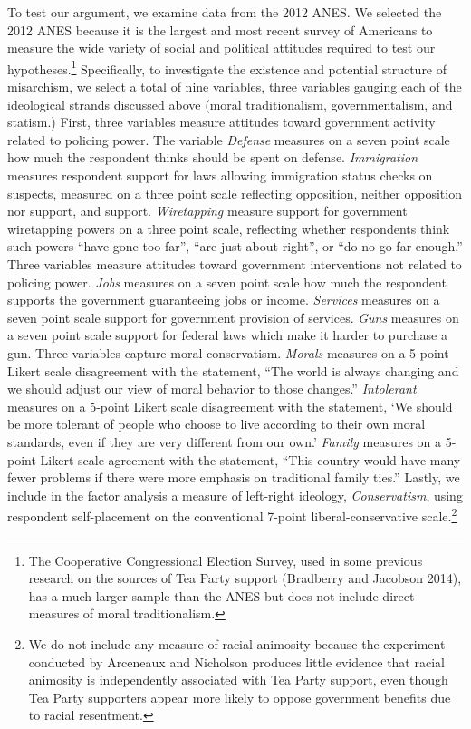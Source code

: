 \documentclass[12pt,]{article}
\begin{document}
To test our argument, we examine data from the 2012 ANES. We selected
the 2012 ANES because it is the largest and most recent survey of
Americans to measure the wide variety of social and political attitudes
required to test our hypotheses.\footnote{The Cooperative Congressional
  Election Survey, used in some previous research on the sources of Tea
  Party support (Bradberry and Jacobson 2014), has a much larger sample
  than the ANES but does not include direct measures of moral
  traditionalism.} Specifically, to investigate the existence and
potential structure of misarchism, we select a total of nine variables,
three variables gauging each of the ideological strands discussed above
(moral traditionalism, governmentalism, and statism.) First, three
variables measure attitudes toward government activity related to
policing power. The variable \emph{Defense} measures on a seven point
scale how much the respondent thinks should be spent on defense.
\emph{Immigration} measures respondent support for laws allowing
immigration status checks on suspects, measured on a three point scale
reflecting opposition, neither opposition nor support, and support.
\emph{Wiretapping} measure support for government wiretapping powers on
a three point scale, reflecting whether respondents think such powers
``have gone too far'', ``are just about right'', or ``do no go far
enough.'' Three variables measure attitudes toward government
interventions not related to policing power. \emph{Jobs} measures on a
seven point scale how much the respondent supports the government
guaranteeing jobs or income. \emph{Services} measures on a seven point
scale support for government provision of services. \emph{Guns} measures
on a seven point scale support for federal laws which make it harder to
purchase a gun. Three variables capture moral conservatism.
\emph{Morals} measures on a 5-point Likert scale disagreement with the
statement, ``The world is always changing and we should adjust our view
of moral behavior to those changes.'' \emph{Intolerant} measures on a
5-point Likert scale disagreement with the statement, `We should be more
tolerant of people who choose to live according to their own moral
standards, even if they are very different from our own.' \emph{Family}
measures on a 5-point Likert scale agreement with the statement, ``This
country would have many fewer problems if there were more emphasis on
traditional family ties.'' Lastly, we include in the factor analysis a
measure of left-right ideology, \emph{Conservatism}, using respondent
self-placement on the conventional 7-point liberal-conservative
scale.\footnote{We do not include any measure of racial animosity
  because the experiment conducted by Arceneaux and Nicholson produces
  little evidence that racial animosity is independently associated with
  Tea Party support, even though Tea Party supporters appear more likely
  to oppose government benefits due to racial resentment.}
\end{document}
